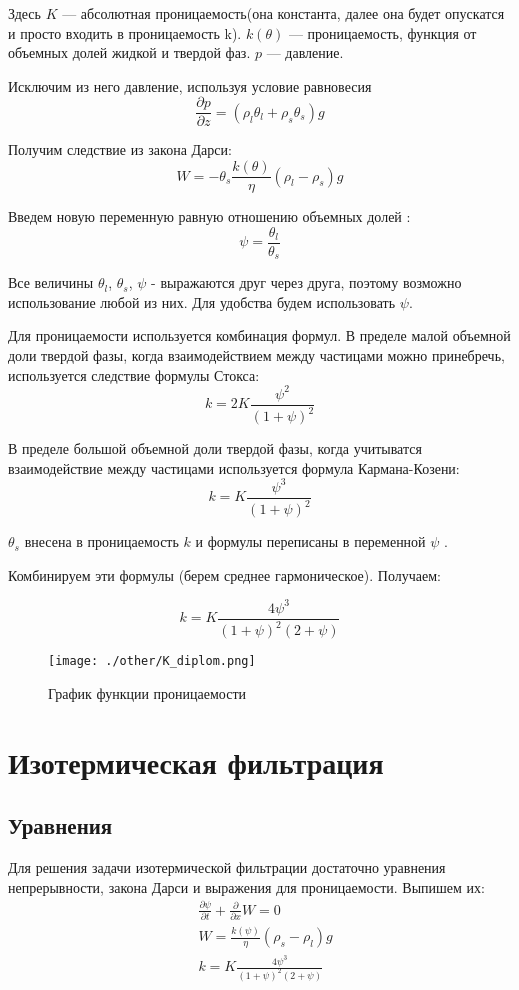 \documentclass[12pt,a4paper]{article}
\newcommand{\pd}[2]{\frac{\partial #1}{\partial #2}}
\begin{document}
Здесь $ K $ --- абсолютная проницаемость(она константа, далее она будет опускатся и просто входить в проницаемость k). $k(\theta)$ --- проницаемость, функция от объемных долей жидкой и твердой фаз. $p$ --- давление. 

Исключим из него давление, используя условие равновесия
$$
\pd{p}{z} = (\rho_l \theta_l + \rho_s \theta_s)g
$$

Получим следствие из закона Дарси:
\begin{equation}
W= -\theta_s \frac{k(\theta)}{\eta}(\rho_l-\rho_s)g
\label{Darsi_new}
\end{equation}

Введем новую переменную равную отношению объемных долей : 
$$
\psi = \frac{\theta_l}{\theta_s} 
$$

Все величины $\theta_l $, $\theta_s $, $\psi $ - выражаются друг через друга, поэтому возможно использование любой из них. Для удобства будем использовать $\psi$.

Для проницаемости используется комбинация формул. В пределе малой объемной доли твердой фазы, когда взаимодействием между частицами можно принебречь, используется следствие формулы Стокса:
$$
k = 2 K\frac{\psi^2}{(1+\psi)^2} 
$$

В пределе большой объемной доли твердой фазы, когда учитыватся взаимодействие между частицами используется формула Кармана-Козени:
$$
k = K\frac{\psi^3}{(1+\psi)^2}
$$

$\theta_s $ внесена в проницаемость $k$ и формулы переписаны в переменной $\psi$ . 

Комбинируем эти формулы (берем среднее гармоническое). Получаем:

\begin{equation}
k = K \frac{4\psi^3}{(1+\psi)^2(2+\psi)}
\label{permability}
\end{equation}

\begin{figure}[h!]
\begin{center}
\texttt{[image: ./other/K\_diplom.png]}
\caption{График функции проницаемости}
\end{center}
\end{figure}
\newpage
\section{Изотермическая фильтрация}
\subsection{Уравнения}
Для решения задачи изотермической фильтрации достаточно уравнения непрерывности, закона Дарси и выражения для проницаемости. Выпишем их:
\begin{equation}
\begin{aligned}
&\pd{\psi}{t} + \pd{}{x}W = 0\\
&W= \frac{k(\psi)}{\eta}(\rho_s-\rho_l)g\\
&k = K \frac{4\psi^3}{(1+\psi)^2(2+\psi)}\\
\label{isotermal}
\end{aligned}
\end{equation}
\end{document}
